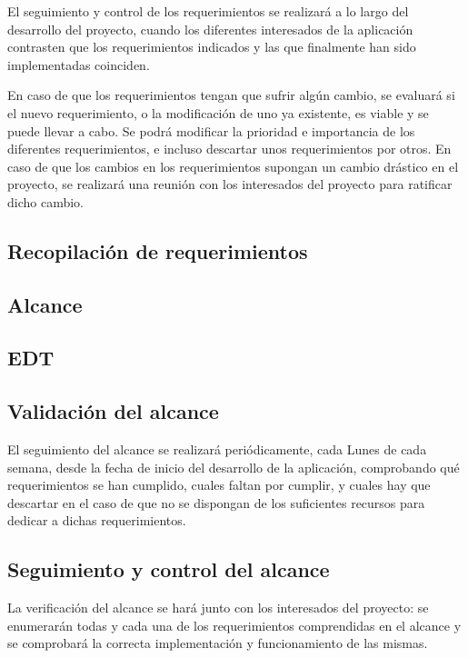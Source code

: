 El seguimiento y control de los requerimientos se realizará a lo largo del
desarrollo del proyecto, cuando los diferentes interesados de la aplicación
contrasten que los requerimientos indicados y las que finalmente han sido
implementadas coinciden.

En caso de que los requerimientos tengan que sufrir algún cambio, se
evaluará si el nuevo requerimiento, o la modificación de uno ya existente,
es viable y se puede llevar a cabo. Se podrá modificar la prioridad e
importancia de los diferentes requerimientos, e incluso descartar unos
requerimientos por otros. En caso de que los cambios en los requerimientos
supongan un cambio drástico en el proyecto, se realizará una reunión con
los interesados del proyecto para ratificar dicho cambio.

\subsection{Recopilación de requerimientos}

\subsection{Alcance}

\subsection{EDT}

\subsection{Validación del alcance}
El seguimiento del alcance se realizará periódicamente, cada Lunes de cada
semana, desde la fecha de inicio del desarrollo de la aplicación, comprobando
qué requerimientos se han cumplido, cuales faltan por cumplir, y cuales hay
que descartar en el caso de que no se dispongan de los suficientes recursos
para dedicar a dichas requerimientos.

\subsection{Seguimiento y control del alcance}
La verificación del alcance se hará junto con los interesados del proyecto:
se enumerarán todas y cada una de los requerimientos comprendidas en el alcance
y se comprobará la correcta implementación y funcionamiento de las mismas.
